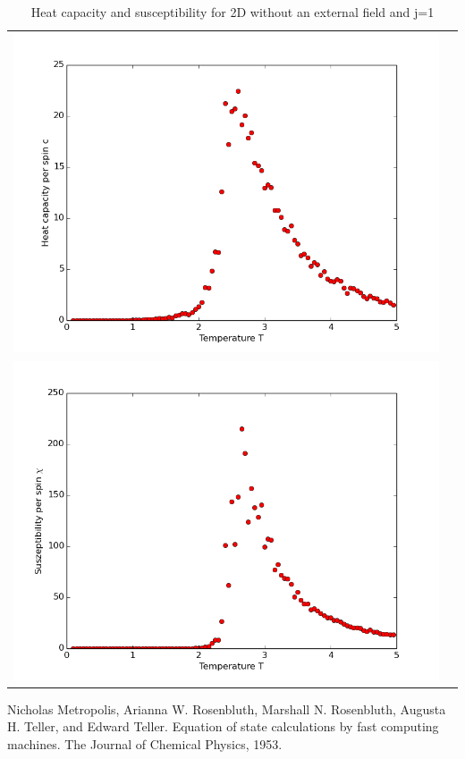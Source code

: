 \documentclass[12pt,a4paper,titlepage]{article}
\begin{document}
\begin{table}
\centering
\begin{tabular}{cc}
\includegraphics[width=13cm]{Plots/Heat_Capacitiy_2}\\
\includegraphics[width=13cm]{Plots/Suszeptibility_2} \\
\end{tabular} 
\caption{Heat capacity and susceptibility for 2D without an external field and j=1}
\end{table}








\begin{thebibliography}{9}



Nicholas Metropolis, Arianna W. Rosenbluth, Marshall N. Rosenbluth, Augusta H. Teller, and Edward
Teller. Equation of state calculations by fast computing machines. The Journal of Chemical Physics, 1953.





\end{thebibliography}
\end{document}
